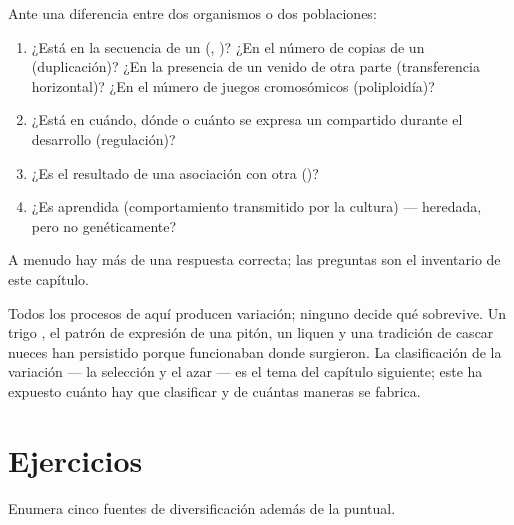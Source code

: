 \begin{method}\label{met:g12:diversification-of-life:name}
Ante una diferencia entre dos organismos o dos poblaciones:
\begin{enumerate}
  \item ¿Está en la secuencia de un  (, )? ¿En el
        número de copias de un  (duplicación)? ¿En la presencia de
        un  venido de otra parte (transferencia horizontal)? ¿En el
        número de juegos cromosómicos (poliploidía)?
  \item ¿Está en cuándo, dónde o cuánto se expresa un  compartido
        durante el desarrollo (regulación)?
  \item ¿Es el resultado de una asociación con otra 
        ()?
  \item ¿Es aprendida (comportamiento transmitido por la cultura) ---
        heredada, pero no genéticamente?
\end{enumerate}
A menudo hay más de una respuesta correcta; las preguntas son el
inventario de este capítulo.
\end{method}

\begin{remark}\label{rem:g12:diversification-of-life:selection}
Todos los procesos de aquí producen variación; ninguno decide qué
sobrevive. Un trigo , el patrón de expresión de una pitón, un
liquen y una tradición de cascar nueces han persistido porque
funcionaban donde surgieron. La clasificación de la variación --- la
selección y el azar --- es el tema del capítulo siguiente; este ha
expuesto cuánto hay que clasificar y de cuántas maneras se fabrica.
\end{remark}

\section{Ejercicios}

\begin{exercise}[$\star$]\label{exo:g12:diversification-of-life:1}
Enumera cinco fuentes de diversificación además de la 
puntual.
\end{exercise}

